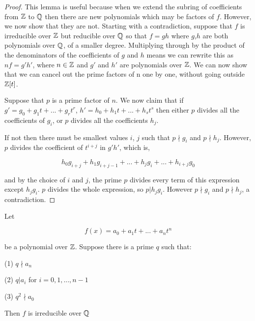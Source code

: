 \begin{proof}
This lemma is useful because when we extend the subring of coefficients from $\mathbb Z$ to $\mathbb Q$ then there are new polynomials which may be factors of $f$. However, we now show that they are not. Starting with a contradiction, suppose that $f$ is irreducible over $\mathbb Z$ but reducible over $\mathbb Q$ so that $f = g h$ where $g$,$h$ are both polynomials over $\mathbb Q$, of a smaller degree. Multiplying through by the product of the denominators of the coefficients of $g$ and $h$ means we can rewrite this as $n f = g' h'$, where $n \in \mathbb Z$ and $g'$ and $h'$ are polynomials over $\mathbb Z$. We can now show that we can cancel out the prime factors of n one by one, without going outside $\mathbb Z[t]$.

Suppose that $p$ is a prime factor of $n$. We now claim that if $g' = g_0 + g_1 t +...+ g_r t^r$, $h' = h_0 + h_1 t +...+ h_s t^s$ then either $p$ divides all the coefficients of $g_i$, or $p$ divides all the coefficients $h_j$.

If not then there must be smallest values $i$, $j$ such that $p \nmid g_i$ and $p \nmid h_j$. However, $p$ divides the coefficient of $t^{i+j}$ in $g' h'$, which is, 

$$
h_0 g_{i+j} + h_1 g_{i+j-1} +...+ h_j g_i +...+ h_{i+j} g_0
$$

and by the choice of $i$ and $j$, the prime $p$ divides every term of this expression except $h_j g_i$. $p$ divides the whole expression, so $p | h_j g_i$. However $p \nmid g_i$ and $p \nmid h_j$, a contradiction.
\end{proof}

\begin{theorem} \label{thm:eisenstein}
     Let
    
    $$f(x) = a_0 + a_1 t + ... + a_n t^n$$
    
    be a polynomial over $\mathbb Z$. Suppose there is a prime $q$ such that:

    (1) $q \nmid a_n$

    (2) $q | a_i$ for $i = {0, 1,..., n-1}$
    
    (3) $q^2 \nmid a_0$
    
    Then $f$ is irreducible over $\mathbb Q$
\end{theorem}

